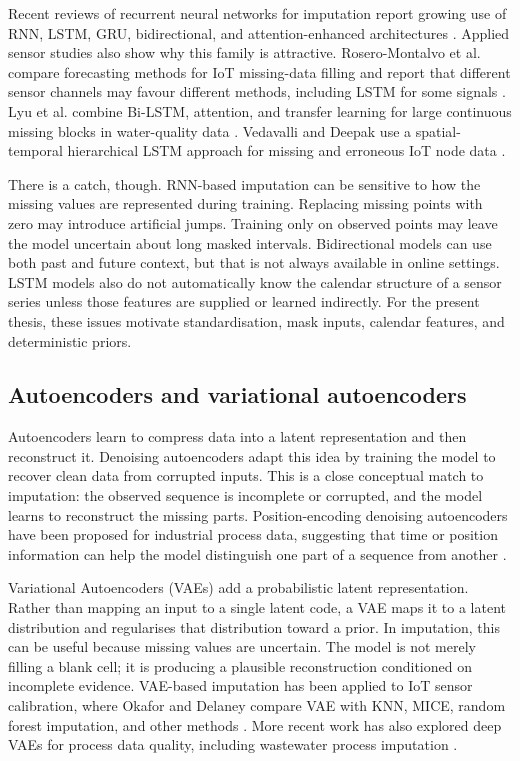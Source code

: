 Recent reviews of recurrent neural networks for imputation report growing use of RNN, LSTM, GRU, bidirectional, and attention-enhanced architectures \cite{Aqilah2025ASR}. Applied sensor studies also show why this family is attractive. Rosero-Montalvo et al. compare forecasting methods for IoT missing-data filling and report that different sensor channels may favour different methods, including LSTM for some signals \cite{RoseroMontalvo2023TimeSeriesFT}. Lyu et al. combine Bi-LSTM, attention, and transfer learning for large continuous missing blocks in water-quality data \cite{Lyu2022}. Vedavalli and Deepak use a spatial-temporal hierarchical LSTM approach for missing and erroneous IoT node data \cite{Vedavalli2023}.

There is a catch, though. RNN-based imputation can be sensitive to how the missing values are represented during training. Replacing missing points with zero may introduce artificial jumps. Training only on observed points may leave the model uncertain about long masked intervals. Bidirectional models can use both past and future context, but that is not always available in online settings. LSTM models also do not automatically know the calendar structure of a sensor series unless those features are supplied or learned indirectly. For the present thesis, these issues motivate standardisation, mask inputs, calendar features, and deterministic priors.

\subsection{Autoencoders and variational autoencoders}

Autoencoders learn to compress data into a latent representation and then reconstruct it. Denoising autoencoders adapt this idea by training the model to recover clean data from corrupted inputs. This is a close conceptual match to imputation: the observed sequence is incomplete or corrupted, and the model learns to reconstruct the missing parts. Position-encoding denoising autoencoders have been proposed for industrial process data, suggesting that time or position information can help the model distinguish one part of a sequence from another \cite{Ou2024MissingDataIW}.

Variational Autoencoders (VAEs) add a probabilistic latent representation. Rather than mapping an input to a single latent code, a VAE maps it to a latent distribution and regularises that distribution toward a prior. In imputation, this can be useful because missing values are uncertain. The model is not merely filling a blank cell; it is producing a plausible reconstruction conditioned on incomplete evidence. VAE-based imputation has been applied to IoT sensor calibration, where Okafor and Delaney compare VAE with KNN, MICE, random forest imputation, and other methods \cite{Okafor2021}. More recent work has also explored deep VAEs for process data quality, including wastewater process imputation \cite{Mbamba2025EnhancingDQ}.

